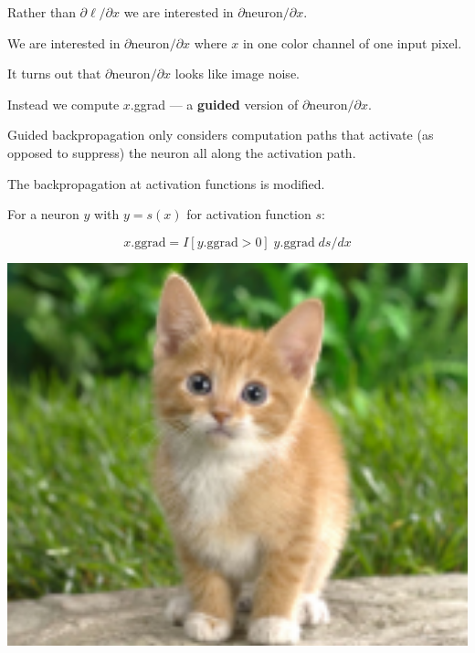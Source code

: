 {

Rather than $\partial \ell/ \partial x$ we are interested in $\partial \mathrm{neuron}/\partial x$.

\vfill
We are interested in $\partial \mathrm{neuron}/\partial x$ where $x$ in one color channel of one input pixel.

\vfill
It turns out that $\partial \mathrm{neuron}/\partial x$ looks like image noise.

\vfill
Instead we compute $x$.ggrad  --- a {\bf guided} version of $\partial \mathrm{neuron}/\partial x$.


\vfill
Guided backpropagation only considers computation paths that activate (as opposed to suppress) the neuron all along the activation path.

\vfill
The backpropagation at activation functions is modified.

\vfill
For a neuron $y$ with $y = s(x)$ for activation function $s$:

$$x.\mathrm{ggrad} = I[y.\mathrm{ggrad} > 0] \;y.\mathrm{ggrad}\; ds/dx$$



\centerline{\includegraphics[width = 6in]{../images/DeconvKitten}}


}
